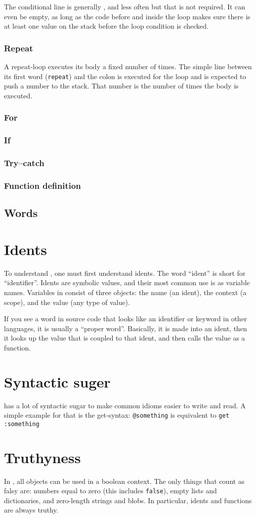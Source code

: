 The conditional line is generally , and less often 
but that is not required. It can even be empty, as long as the code before and inside the loop makes sure there is at least one value on the stack before the loop
condition is checked.

\subsubsection{Repeat}

A repeat-loop executes its body a fixed number of times. The simple line
between its first word (\verb!repeat!) and the colon is executed for the loop
and is expected to push a number to the stack. That number is the number
of times the body is executed.

\subsubsection{For}
\subsubsection{If}
\subsubsection{Try--catch}
\subsubsection{Function definition}
\subsection{Words}
\section{Idents}
To understand \dv, one must first understand idents. The word
``ident'' is short for ``identifier''. Idents are symbolic values,
and their most common use is as variable names. Variables in \dv{}
consist of three objects: the name (an ident), the context (a scope),
and the value (any type of value).

If you see a word in \dv{} source code that looks like an identifier or
keyword in other languages, it is usually a ``proper word''. Basically, it is made into an
ident, then it looks up the value that is coupled to that ident, and
then calls the value as a function.

\section{Syntactic suger}
\dv{} has a lot of syntactic sugar to make common idioms easier to write
and read. A simple example for that is the get-syntax: \verb!@something!
is equivalent to \verb!get :something!

\section{Truthyness}

In \dv{}, all objects can be used in a boolean context. The only things that
count as falsy are: numbers equal to zero (this includes \verb!false!), empty
lists and dictionaries, and zero-length strings and blobs. In particular, idents
and functions are always truthy.
